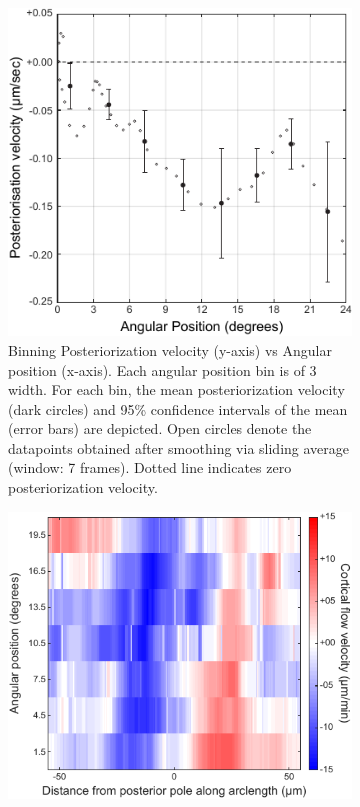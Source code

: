 \begin{figure}[h]
\centering

\begin{subfigure}[t]{0.45\textwidth}
    \centering
    \includegraphics[width=\textwidth]{ExpMethods/FigDataAnalysis/postVel.pdf}
    \caption{Binning Posteriorization velocity (y-axis) vs Angular position (x-axis). Each angular position bin is of \SI{3}{\unitAngle} width. For each bin, the mean posteriorization velocity (dark circles) and 95\% confidence intervals of the mean (error bars) are depicted. Open circles denote the datapoints obtained after smoothing via sliding average (window: \num{7} frames). Dotted line indicates zero posteriorization velocity.} 
    \label{subfig:dataAnalysisExample-postVel}
\end{subfigure}
\hfill
\begin{subfigure}[t]{0.5\textwidth}
    \centering
    \includegraphics[width=\textwidth]{ExpMethods/FigDataAnalysis/crtxFlow.pdf}

\end{subfigure}
\end{figure}
